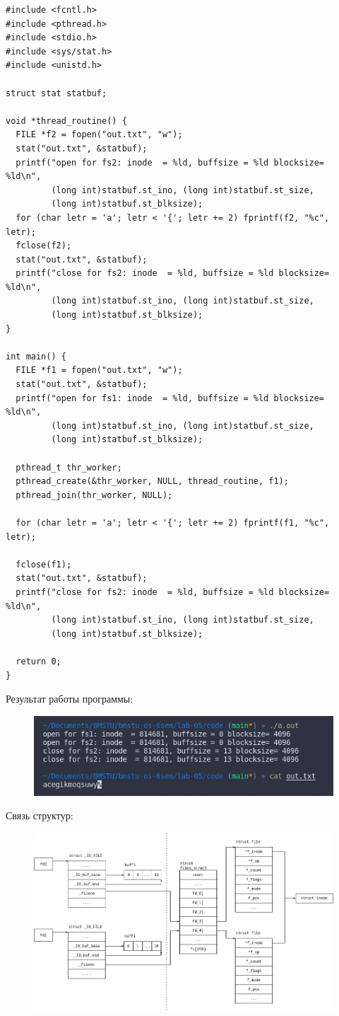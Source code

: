 \begin{lstlisting}
#include <fcntl.h>
#include <pthread.h>
#include <stdio.h>
#include <sys/stat.h>
#include <unistd.h>

struct stat statbuf;

void *thread_routine() {
  FILE *f2 = fopen("out.txt", "w");
  stat("out.txt", &statbuf);
  printf("open for fs2: inode  = %ld, buffsize = %ld blocksize= %ld\n",
         (long int)statbuf.st_ino, (long int)statbuf.st_size,
         (long int)statbuf.st_blksize);
  for (char letr = 'a'; letr < '{'; letr += 2) fprintf(f2, "%c", letr);
  fclose(f2);
  stat("out.txt", &statbuf);
  printf("close for fs2: inode  = %ld, buffsize = %ld blocksize= %ld\n",
         (long int)statbuf.st_ino, (long int)statbuf.st_size,
         (long int)statbuf.st_blksize);
}

int main() {
  FILE *f1 = fopen("out.txt", "w");
  stat("out.txt", &statbuf);
  printf("open for fs1: inode  = %ld, buffsize = %ld blocksize= %ld\n",
         (long int)statbuf.st_ino, (long int)statbuf.st_size,
         (long int)statbuf.st_blksize);

  pthread_t thr_worker;
  pthread_create(&thr_worker, NULL, thread_routine, f1);
  pthread_join(thr_worker, NULL);

  for (char letr = 'a'; letr < '{'; letr += 2) fprintf(f1, "%c", letr);

  fclose(f1);
  stat("out.txt", &statbuf);
  printf("close for fs2: inode  = %ld, buffsize = %ld blocksize= %ld\n",
         (long int)statbuf.st_ino, (long int)statbuf.st_size,
         (long int)statbuf.st_blksize);

  return 0;
}
\end{lstlisting}
Результат работы программы:
\begin{figure}[H]
	\centering
	\includegraphics[scale=0.8]{assets/d_3_thread.png}
\end{figure}

Связь структур:
\begin{figure}[H]
	\centering
	\includegraphics[scale=0.55]{assets/d_3.png}
\end{figure}